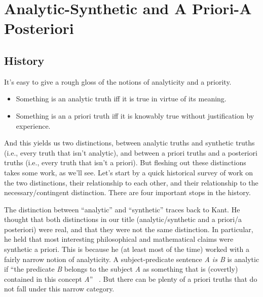 \chapter[Analytic / A Priori]{Analytic-Synthetic and A Priori-A Posteriori}
\section{History}
\label{history}

It's easy to give a rough gloss of the notions of analyticity and a priority.

\begin{itemize}
\item Something is an analytic truth iff it is true in virtue of its meaning.

\item Something is an a priori truth iff it is knowably true without justification by experience.

\end{itemize}
And this yields us two distinctions, between analytic truths and synthetic truths (i.e., every truth that isn't analytic), and between a priori truths and a posteriori truths (i.e., every truth that isn't a priori). But fleshing out these distinctions takes some work, as we'll see. Let's start by a quick historical survey of work on the two distinctions, their relationship to each other, and their relationship to the necessary\slash contingent distinction. There are four important stops in the history.

The distinction between ``analytic'' and ``synthetic'' traces back to Kant. He thought that both distinctions in our title (analytic\slash synthetic and a priori\slash a posteriori) were real, and that they were not the same distinction. In particular, he held that most interesting philosophical and mathematical claims were synthetic a priori. This is because he (at least most of the time) worked with a fairly narrow notion of analyticity. A subject-predicate sentence \emph{A is B} is analytic if ``the predicate \emph{B} belongs to the subject \emph{A} as something that is (covertly) contained in this concept \emph{A}'' ~\citep[6]{KantFirstCritique}. But there can be plenty of a priori truths that do not fall under this narrow category.

